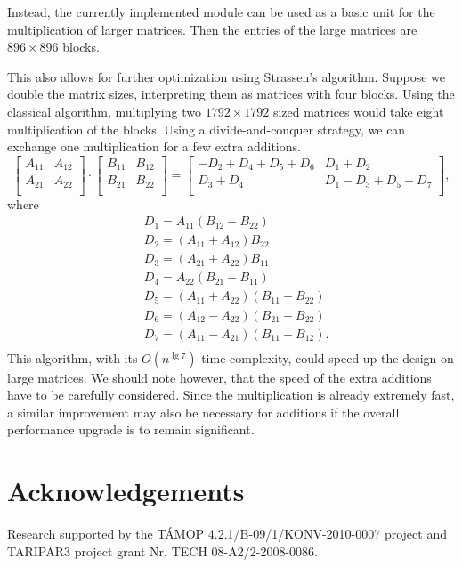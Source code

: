 \documentclass[11pt,twoside]{article}
\begin{document}
Instead, the currently implemented module can be used as a basic unit for the multiplication of larger matrices. Then the entries of the large matrices are $896 \times 896$ blocks.

This also allows for further optimization using Strassen's algorithm. Suppose we double the matrix sizes, interpreting them as matrices with four blocks. Using the classical algorithm, multiplying two $1792 \times 1792$ sized matrices would take eight multiplication of the blocks. Using a divide-and-conquer strategy, we can exchange one multiplication for a few extra additions.
\[
\left[
\begin{matrix}
A_{11} & A_{12} \\
A_{21} & A_{22} \\
\end{matrix}
\right]
\cdot
\left[
\begin{matrix}
B_{11} & B_{12} \\
B_{21} & B_{22} \\
\end{matrix}
\right]
=
\left[
\begin{matrix}
-D_2+D_4+D_5+D_6 & D_1+D_2 \\
D_3+D_4 & D_1-D_3+D_5-D_7 \\
\end{matrix}
\right],
\]
where
\begin{align*}
&D_1=A_{11}(B_{12}-B_{22}) \\
&D_2=(A_{11}+A_{12})B_{22} \\
&D_3=(A_{21}+A_{22})B_{11} \\
&D_4=A_{22}(B_{21}-B_{11}) \\
&D_5=(A_{11}+A_{22})(B_{11}+B_{22})\\
&D_6=(A_{12}-A_{22})(B_{21}+B_{22})\\
&D_7=(A_{11}-A_{21})(B_{11}+B_{12}).\\
\end{align*}
This algorithm, with its $O(n^{\lg  7})$ time complexity, could speed up the design on large matrices. We should note however, that the speed of the extra additions have to be carefully considered. Since the multiplication is already extremely fast, a similar improvement may also be necessary for additions if the overall performance upgrade is to remain significant.


\section*{Acknowledgements}
Research supported by the T\'AMOP 4.2.1/B-09/1/KONV-2010-0007 project and TARIPAR3 project grant Nr. TECH 08-A2/2-2008-0086.
\end{document}
